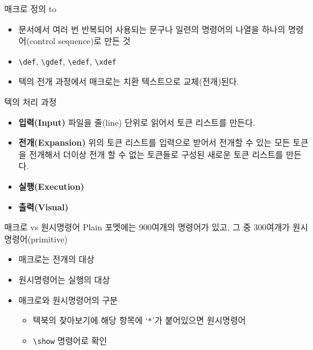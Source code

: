 \documentclass{beamer}
\begin{document}
%
\begin{frame}[fragile]{매크로 정의}
  \medskip
  \hbox to
  \smallskip
  \begin{itemize}
  \item 문서에서 여러 번 반복되어 사용되는 문구나 일련의 명령어의 나열을
    하나의 명령어(control sequence)로 만든 것
  \item \verb+\def+, \verb+\gdef+, \verb+\edef+, \verb+\xdef+
  \item 텍의 \alert{전개 과정}에서 매크로는 치환 텍스트으로 교체(전개)된다.
%    
  \end{itemize}
\end{frame}


%
\begin{frame}{텍의 처리 과정}  
  \begin{itemize}
  \item \alert{\bf 입력(Input)} 파일을 줄(line) 단위로 읽어서
    \alert{토큰 리스트}를 만든다.
  \item \alert{\bf 전개(Expansion)} 위의 토큰 리스트를 입력으로
    받어서 전개할 수 있는
    모든 토큰을 전개해서 더이상 전개 할 수 없는 토큰들로 구성된
    새로운 토큰 리스트를 만든다.
  \item \alert{\bf 실행(Execution)}
  \item \alert{\bf 출력(Visual)}
  \end{itemize}
\end{frame}


%
\begin{frame}[fragile]{매크로 vs 원시명령어}
  Plain 포멧에는 900여개의 명령어가 있고, 그 중 300여개가 원시명령어(primitive)
  \begin{itemize}
  \item 매크로는 \alert{전개}의 대상
  \item 원시명령어는 \alert{실행}의 대상
  \item 매크로와 원시명령어의 구분
    \begin{itemize}
    \item 텍북의 찾아보기에 해당 항목에 `\verb+*+'가 붙어있으면 원시명령어
    \item \verb+\show+ 명령어로 확인
    \end{itemize}
  \end{itemize}
\end{frame}
\end{document}

